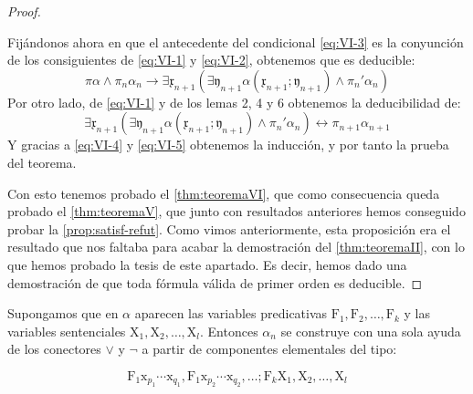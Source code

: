 \begin{proof}
\begin{itemize}
                Fijándonos ahora en que el antecedente del condicional \eqref{eq:VI-3} es la conyunción de los consiguientes de \eqref{eq:VI-1} y \eqref{eq:VI-2},
                obtenemos que es deducible:
                \begin{equation} \label{eq:VI-4}
                    \pi\alpha \wedge \pi_n\alpha_n \rightarrow \exists \mathfrak{x}_{n+1} (\exists \mathfrak{y}_{n+1} 
                    \alpha (\mathfrak{x}_{n+1} ; \mathfrak{y}_{n+1} ) \wedge \pi_n'\alpha_n)
                \end{equation}
                Por otro lado, de \eqref{eq:VI-1} y de los lemas 2, 4 y 6 obtenemos la deducibilidad de:
                \begin{equation} \label{eq:VI-5}
                    \exists \mathfrak{x}_{n+1} (\exists \mathfrak{y}_{n+1} \alpha (\mathfrak{x}_{n+1} ; \mathfrak{y}_{n+1} ) \wedge \pi_n'\alpha_n)
                    \leftrightarrow \pi_{n+1}\alpha_{n+1}
                \end{equation}
                Y gracias a \eqref{eq:VI-4} y \eqref{eq:VI-5} obtenemos la inducción, y por tanto la prueba del teorema.
    \end{itemize}

    Con esto tenemos probado el \autoref{thm:teoremaVI}, que como consecuencia queda probado el \autoref{thm:teoremaV}, que junto con resultados anteriores hemos conseguido 
    probar la \autoref{prop:satisf-refut}. Como vimos anteriormente, esta proposición era el resultado que nos faltaba para acabar la demostración del \autoref{thm:teoremaII}, 
    con lo que hemos probado la tesis de este apartado. Es decir, hemos dado una demostración de que toda fórmula válida de primer orden es deducible.
\end{proof}


Supongamos que en $\alpha$ aparecen las variables predicativas $\text{F}_1, \text{F}_2, \dots, \text{F}_k$ y las variables sentenciales $\text{X}_1, \text{X}_2, \dots, \text{X}_l$.
Entonces $\alpha_n$ se construye con una sola ayuda de los conectores $\vee$ y $\lnot$ a partir de componentes elementales del tipo:

\begin{equation}
    \text{F}_1 \text{x}_{p_1} \cdots \text{x}_{q_1}, \text{F}_1 \text{x}_{p_2} \cdots \text{x}_{q_2}, \dots; \text{F}_k \text{X}_1, \text{X}_2, \dots, \text{X}_l
\end{equation}

